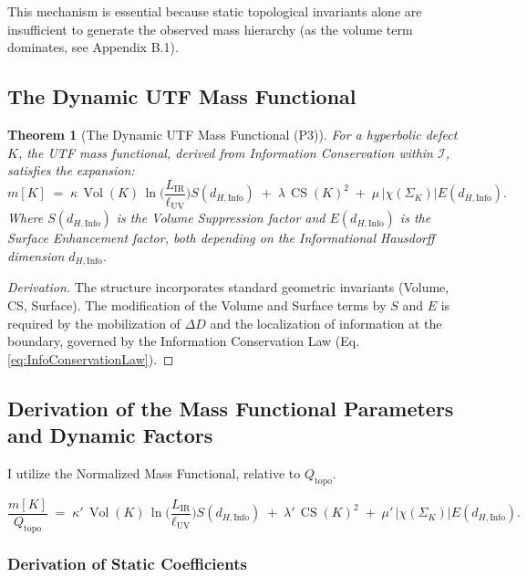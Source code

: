 \documentclass[11pt, a4paper]{article}
\newtheorem{theorem}{Theorem}[section]
\theoremstyle{definition}
\theoremstyle{definition}
\newcommand{\Qtopo}{Q_{\text{topo}}}
\newcommand{\Ical}{\mathcal{I}}
\newcommand{\CS}{\operatorname{CS}}
\newcommand{\Vol}{\operatorname{Vol}}
\newcommand{\LIR}{L_{\mathrm{IR}}}
\newcommand{\lUV}{\ell_{\mathrm{UV}}}
\newcommand{\V}[1]{\Vol(#1)}
\newcommand{\dHInfo}{d_{H,\mathrm{Info}}} %
\begin{document}
This mechanism is essential because static topological invariants alone are insufficient to generate the observed mass hierarchy (as the volume term dominates, see Appendix B.1).

\subsection{The Dynamic UTF Mass Functional}

\begin{theorem}[The Dynamic UTF Mass Functional (P3)]\label{thm:MassFunctional}
For a hyperbolic defect $K$, the UTF mass functional, derived from Information Conservation within $\Ical$, satisfies the expansion:
\begin{equation}\label{eq:UTFMass}
  m[K] \;=\; \kappa \,\V{K}\,\ln\!\Big(\frac{\LIR}{\lUV}\Big) S(\dHInfo) \;+\; \lambda\, \CS(K)^2 \;+\; \mu\,|\chi(\Sigma_K)| E(\dHInfo).
\end{equation}
Where $S(\dHInfo)$ is the Volume Suppression factor and $E(\dHInfo)$ is the Surface Enhancement factor, both depending on the Informational Hausdorff dimension $\dHInfo$.
\end{theorem}

\begin{proof}[Derivation]
The structure incorporates standard geometric invariants (Volume, CS, Surface). The modification of the Volume and Surface terms by $S$ and $E$ is required by the mobilization of $\Delta D$ and the localization of information at the boundary, governed by the Information Conservation Law (Eq. \eqref{eq:InfoConservationLaw}).
\end{proof}

\subsection{Derivation of the Mass Functional Parameters and Dynamic Factors}
\label{sec:ParameterDerivation}

I utilize the Normalized Mass Functional, relative to $\Qtopo$.

\begin{equation}\label{eq:UTFMassNormalized}
  \frac{m[K]}{\Qtopo} \;=\; \kappa' \,\V{K}\,\ln\!\Big(\frac{\LIR}{\lUV}\Big) S(\dHInfo) \;+\; \lambda'\, \CS(K)^2 \;+\; \mu'\,|\chi(\Sigma_K)| E(\dHInfo).
\end{equation}

\subsubsection{Derivation of Static Coefficients}
\end{document}
